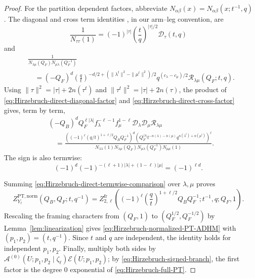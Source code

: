 \documentclass{amsart}
\theoremstyle{definition}
\numberwithin{equation}{section}
\newcommand{\PT}{\mathrm{PT}}
\begin{document}
\begin{proof}
For the partition dependent factors, abbreviate \(N_{\alpha\beta}(x)=N_{\alpha\beta}(x;t^{-1},q)\).  The diagonal and cross term identities \cite[equations~(3.12)--(3.14) in the arXiv version]{TakiRefined}, in our arm--leg convention, are
\begin{equation}
 \frac1{N_{\tau\tau}(1)}
 =(-1)^{|\tau|}\left(\frac tq\right)^{|\tau|/2}
  \mathscr D_\tau(t,q)
\label{eq:Hirzebruch-direct-diagonal-factor}
\end{equation}
and
\begin{equation}
\begin{aligned}
 &\frac1{N_{\lambda\mu}(Q_F)N_{\mu\lambda}(Q_F^{-1})}\\
 &\quad=(-Q_F)^d
 \left(\frac qt\right)^{-d/2+
 (\|\lambda^t\|^2-\|\mu^t\|^2)/2}
 q^{(c_\lambda-c_\mu)/2}
 \mathscr R_{\lambda\mu}(Q_F;t,q).
\end{aligned}
\label{eq:Hirzebruch-direct-cross-factor}
\end{equation}
Using \(\|\tau\|^2=|\tau|+2n(\tau^t)\) and \(\|\tau^t\|^2=|\tau|+2n(\tau)\), the product of \eqref{eq:Hirzebruch-direct-diagonal-factor} and \eqref{eq:Hirzebruch-direct-cross-factor} gives, term by term,
\begin{equation}
\begin{aligned}
 &(-Q_B)^dQ_F^{\ell|\lambda|}
 f_\lambda^{-\ell-1}f_\mu^{1-\ell}
 \mathscr D_\lambda\mathscr D_\mu\mathscr R_{\lambda\mu}\\
 &\quad=
 \frac{\left((-1)^\ell(q/t)^{1+\ell/2}
 Q_BQ_F^{-1}\right)^d
 \left(
 Q_F^{|\lambda|}t^{-n(\lambda)-n(\mu)}
 q^{n(\lambda^t)+n(\mu^t)}
 \right)^\ell}
 {N_{\lambda\lambda}(1)N_{\lambda\mu}(Q_F)
  N_{\mu\lambda}(Q_F^{-1})N_{\mu\mu}(1)}.
\end{aligned}
\label{eq:Hirzebruch-direct-termwise-comparison}
\end{equation}
The sign is also termwise:
\begin{equation}
 (-1)^d
 (-1)^{-(\ell+1)|\lambda|+(1-\ell)|\mu|}
 =(-1)^{\ell d}.
\label{eq:Hirzebruch-parity-conversion}
\end{equation}

Summing \eqref{eq:Hirzebruch-direct-termwise-comparison} over \(\lambda,\mu\) proves
\begin{equation}
 Z_{Y_\ell}^{\PT,\mathrm{norm}}(Q_B,Q_F;t,q^{-1})
 =Z_{2,\ell}^{\mathrm{fr}}\left(
 (-1)^\ell\left(\frac qt\right)^{1+\ell/2}
 Q_BQ_F^{-1};t^{-1},q;Q_F,1\right).
\label{eq:Hirzebruch-uncentered-comparison}
\end{equation}
Rescaling the framing characters from \((Q_F,1)\) to \((Q_F^{1/2},Q_F^{-1/2})\) by Lemma~\ref{lem:linearization} gives \eqref{eq:Hirzebruch-normalized-PT-ADHM} with \((p_1,p_2)=(t,q^{-1})\).  Since \(t\) and \(q\) are independent, the identity holds for independent \(p_1,p_2\).  Finally, multiply both sides by \(\mathcal A^{(0)}(U;p_1,p_2\mid\zeta_\ell) \mathcal E(U;p_1,p_2)\); by \eqref{eq:Hirzebruch-signed-branch}, the first factor is the degree \(0\) exponential of \eqref{eq:Hirzebruch-full-PT}.
\end{proof}
\end{document}
